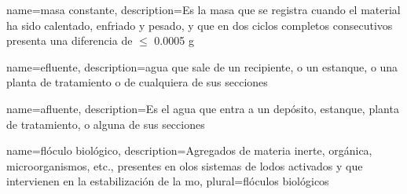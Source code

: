 {
	name={masa constante},
	description={Es la masa que se registra cuando el material ha sido calentado, enfriado y pesado, y que en dos ciclos completos consecutivos presenta una diferencia de $\leq$ 0.0005 g}
}

{
	name={efluente},
	description={agua que sale de un recipiente, o un estanque, o una planta de tratamiento o de cualquiera de sus secciones}
}

{
	name=afluente,
	description={Es el agua que entra a un depósito, estanque, planta de tratamiento, o alguna de sus secciones}
}

{
	name={flóculo biológico},
	description={Agregados de materia inerte, orgánica, microorganismos, etc., presentes en olos sistemas de lodos activados y que intervienen en la estabilización de la \gls{mo}},
	plural={flóculos biológicos}
}



